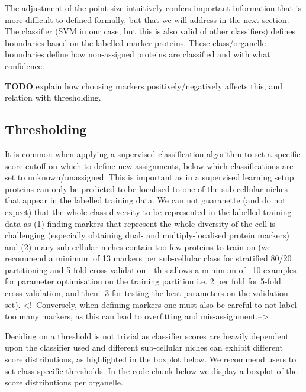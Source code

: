 The adjustment of the point size intuitively confers important
information that is more difficult to defined formally, but that we
will address in the next section. The classifier (SVM in our case, but
this is also valid of other classifiers) defines boundaries based on
the labelled marker proteins. These class/organelle boundaries define
how non-assigned proteins are classified and with what confidence.

\textbf{TODO} explain how choosing markers positively/negatively
affects this, and relation with thresholding.

\subsection*{Thresholding}\label{sec:thresholding}

It is common when applying a supervised classification algorithm to
set a specific score cutoff on which to define new assignments, below
which classifications are set to unknown/unassigned. This is important
as in a supervised learning setup proteins can only be predicted to be
localised to one of the sub-cellular niches that appear in the
labelled training data. We can not guaranette (and do not expect) that
the whole class diversity to be represented in the labelled training
data as (1) finding markers that represent the whole diversity of the
cell is challenging (especially obtaining dual- and multiply-localised
protein markers) and (2) many sub-cellular niches contain too few
proteins to train on (we recommend a minimum of 13 markers per
sub-cellular class for stratified 80/20 partitioning and 5-fold
cross-validation - this allows a minimum of ~10 examples for parameter
optimisation on the training partition i.e. 2 per fold for 5-fold
cross-validation, and then ~3 for testing the best parameters on the
validation set). <!--Conversely, when defining markers one must also
be careful to not label too many markers, as this can lead to
overfitting and mis-assignment.-->

Deciding on a threshold is not trivial as classifier scores are
heavily dependent upon the classifier used and different sub-cellular
niches can exhibit different score distributions, as highlighted in
the boxplot below. We recommend users to set class-specific
thresholds.  In the code chunk below we display a boxplot of the score
distributions per organelle. 


